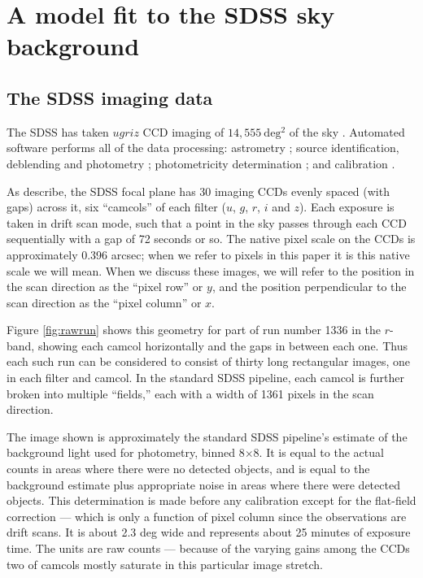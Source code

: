 \documentclass[10pt,preprint]{aastex}
\begin{document}
\section{A model fit to the SDSS sky background}
\label{sec:model}

\subsection{The SDSS imaging data}
\label{sec:data}

The SDSS has taken $ugriz$ CCD imaging of $14,555~\mathrm{deg^2}$ of
the sky \citep{york00a,agol11a}.  Automated software performs all of
the data processing: astrometry \citep{pier03a}; source
identification, deblending and photometry \citep{lupton01a};
photometricity determination \citep{hogg01a}; and calibration
\citep{fukugita96a,smith02a, padmanabhan07b}.

As \citet{gunn05a} describe, the SDSS focal plane has 30 imaging CCDs
evenly spaced (with gaps) across it, six ``camcols'' of each filter
($u$, $g$, $r$, $i$ and $z$). Each exposure is taken in drift scan
mode, such that a point in the sky passes through each CCD
sequentially with a gap of 72 seconds or so.  The native pixel scale
on the CCDs is approximately 0.396 arcsec; when we refer to pixels in
this paper it is this native scale we will mean. When we discuss these
images, we will refer to the position in the scan direction as the
``pixel row'' or $y$, and the position perpendicular to the scan
direction as the ``pixel column'' or $x$.

Figure \ref{fig:rawrun} shows this geometry for part of run number
1336 in the $r$-band, showing each camcol horizontally and the gaps in
between each one. Thus each such run can be considered to consist of
thirty long rectangular images, one in each filter and camcol. In the
standard SDSS pipeline, each camcol is further broken into multiple
``fields,'' each with a width of 1361 pixels in the scan direction.

The image shown is approximately the standard SDSS pipeline's estimate
of the background light used for photometry, binned 8$\times$8. It is
equal to the actual counts in areas where there were no detected
objects, and is equal to the background estimate plus appropriate
noise in areas where there were detected objects. This determination
is made before any calibration except for the flat-field correction
--- which is only a function of pixel column since the observations
are drift scans.  It is about 2.3 deg wide and represents about 25
minutes of exposure time. The units are raw counts --- because of the
varying gains among the CCDs two of camcols mostly saturate in this
particular image stretch.
\end{document}
